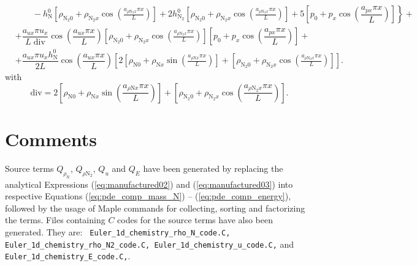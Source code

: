\documentclass[10pt]{article}
\begin{document}
\begin{equation}
\begin{split}
    &\qquad -\left. h^{0}_{\text{N}} \left[ \rho_{\text{N}_2 0}+ \rho_{\text{N}_2 x} \cos\left(\frac{a_{ \rho \text{N}_2 x } \pi x}{L}\right)\right]+2 h^{0}_{\text{N}_2} \left[ \rho_{\text{N}_2 0}+ \rho_{\text{N}_2 x} \cos\left(\frac{a_{ \rho \text{N}_2 x } \pi x}{L}\right)\right]+5 \left[ p_{0}+p_{x} \cos\left(\dfrac{a_{p x} \pi x}{L}\right)\right] \right\} +\\
&+ \dfrac{a_{ux} \pi u_x}{L \; \text{div}} \cos\left(\dfrac{ a_{ux} \pi x}{L}\right) \left[ \rho_{\text{N}_2 0}+ \rho_{\text{N}_2 x} \cos\left(\frac{a_{ \rho \text{N}_2 x } \pi x}{L}\right)\right] \left[ p_{0}+p_{x} \cos\left(\dfrac{a_{p x} \pi x}{L}\right)\right] +\\
&+ \dfrac{a_{ux} \pi u_x h^{0}_{\text{N}}}{2L} \cos\left(\dfrac{ a_{ux} \pi x}{L}\right) \left[ 2 \left[\rho_{\text{N}0} + \rho_{\text{N}x} \sin\left(\frac{a_{ \rho \text{N} x }\pi x}{L}\right)\right] + \left[ \rho_{\text{N}_2 0}+ \rho_{\text{N}_2 x} \cos\left(\frac{a_{ \rho \text{N}_2 x } \pi x}{L}\right)\right] \right].
\end{split}
\end{equation}
with $$\text{div}= 2 \left[\rho_{\text{N}0} + \rho_{\text{N}x} \sin\left(\frac{a_{ \rho \text{N} x }\pi x}{L}\right)\right] + \left[ \rho_{\text{N}_2 0}+ \rho_{\text{N}_2 x} \cos\left(\frac{a_{ \rho \text{N}_2 x } \pi x}{L}\right)\right].$$

\section{Comments}


Source terms $Q_{\rho_\text{N} }$, $Q_{\rho \text{N}_{2}}$, $Q_u$ and $Q_E$ have been generated by replacing the analytical Expressions (\ref{eq:manufactured02}) and  (\ref{eq:manufactured03}) into respective Equations (\ref{eq:pde_comp_mass_N}) -- (\ref{eq:pde_comp_energy}), followed by the usage of Maple commands for collecting, sorting and factorizing the terms. Files containing $C$ codes for the source terms have also been generated. They are: \texttt{ Euler\_1d\_chemistry\_rho\_N\_code.C, Euler\_1d\_chemistry\_rho\_N2\_code.C, Euler\_1d\_chemistry\_u\_code.C,} and \texttt{Euler\_1d\_chemistry\_E\_code.C,}.
\end{document}
